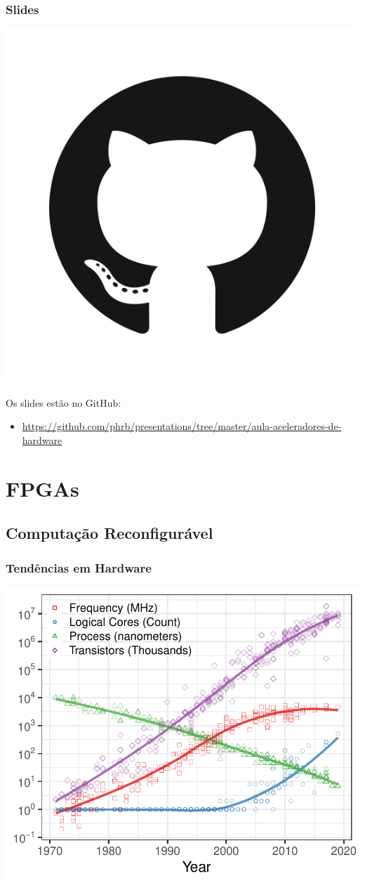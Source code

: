 \documentclass[10pt, compress, aspectratio=169, xcolor={table,usenames,dvipsnames}]{beamer}
\begin{document}
\begin{frame}
    \frametitle{Slides}
    \begin{center}
        \includegraphics[width=.14\textwidth]{github}
    \end{center}
    Os slides estão no \alert{GitHub}:

    \begin{itemize}
        \item \url{https://github.com/phrb/presentations/tree/master/aula-aceleradores-de-hardware}
    \end{itemize}
\end{frame}

\section{FPGAs}

\subsection{Computação Reconfigurável}

\begin{frame}
    \frametitle{Tendências em Hardware}
    \begin{center}
        \includegraphics[width=.95\textwidth]{49_years_processor_data}
    \end{center}
\end{frame}
\end{document}
